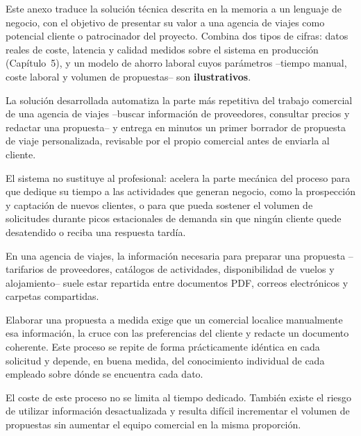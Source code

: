 
Este anexo traduce la solución técnica descrita en la memoria a un lenguaje de negocio,
con el objetivo de presentar su valor a una agencia de viajes como potencial cliente o
patrocinador del proyecto. Combina dos tipos de cifras: datos reales de coste, latencia
y calidad medidos sobre el sistema en producción (Capítulo~5), y un modelo de ahorro
laboral cuyos parámetros --tiempo manual, coste laboral y volumen de propuestas-- son
\textbf{ilustrativos}.


La solución desarrollada automatiza la parte más repetitiva del trabajo comercial de una
agencia de viajes --buscar información de proveedores, consultar precios y redactar una
propuesta-- y entrega en minutos un primer borrador de propuesta de viaje personalizada,
revisable por el propio comercial antes de enviarla al cliente.

El sistema no sustituye al profesional: acelera la parte mecánica del proceso para que
dedique su tiempo a las actividades que generan negocio, como la prospección y captación
de nuevos clientes, o para que pueda sostener el volumen de solicitudes durante picos
estacionales de demanda sin que ningún cliente quede desatendido o reciba una respuesta
tardía.


En una agencia de viajes, la información necesaria para preparar una propuesta
--tarifarios de proveedores, catálogos de actividades, disponibilidad de vuelos y
alojamiento-- suele estar repartida entre documentos PDF, correos electrónicos y
carpetas compartidas.

Elaborar una propuesta a medida exige que un comercial localice manualmente esa
información, la cruce con las preferencias del cliente y redacte un documento coherente.
Este proceso se repite de forma prácticamente idéntica en cada solicitud y depende, en
buena medida, del conocimiento individual de cada empleado sobre dónde se encuentra
cada dato.

El coste de este proceso no se limita al tiempo dedicado. También existe el riesgo de
utilizar información desactualizada y resulta difícil incrementar el volumen de
propuestas sin aumentar el equipo comercial en la misma proporción.


